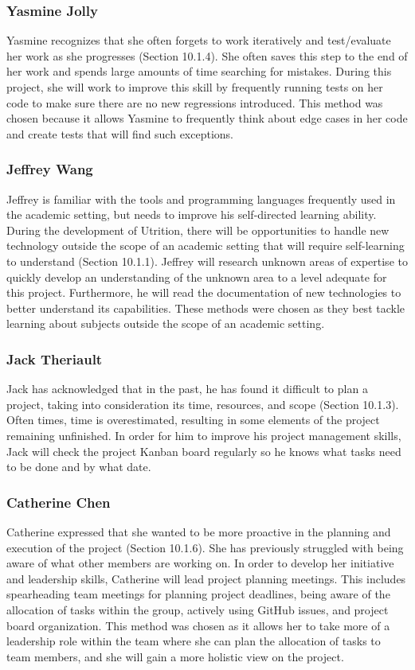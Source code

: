 \documentclass[12pt]{article}
\begin{document}
\subsubsection{Yasmine Jolly}
Yasmine recognizes that she often forgets to work iteratively and test/evaluate her work as she progresses (Section 10.1.4). She often saves this step to the end of her work and spends large amounts of time searching for mistakes. During this project, she will work to improve this skill by frequently running tests on her code to make sure there are no new regressions introduced. This method was chosen because it allows Yasmine to frequently think about edge cases in her code and create tests that will find such exceptions.

\subsubsection{Jeffrey Wang}
Jeffrey is familiar with the tools and programming languages frequently 
used in the academic setting, but needs to improve his self-directed learning 
ability. During the development of Utrition, there will be opportunities to 
handle new technology outside the scope of an academic setting that will 
require self-learning to understand (Section 10.1.1). Jeffrey will research 
unknown areas of expertise to quickly develop an understanding of the unknown 
area to a level adequate for this project. Furthermore, he will read the 
documentation of new technologies to better understand its capabilities. These 
methods were chosen as they best tackle learning about subjects outside the 
scope of an academic setting.

\subsubsection{Jack Theriault}
Jack has acknowledged that in the past, he has found it difficult to plan a project, taking into consideration its time, resources, and scope (Section 10.1.3). Often times, time is overestimated, resulting in some elements of the project remaining unfinished. In order for him to improve his project management skills, Jack will check the project Kanban board regularly so he knows what tasks need to be done and by what date.


\subsubsection{Catherine Chen}
Catherine expressed that she wanted to be more proactive in the planning and execution of the project (Section 10.1.6). She has previously struggled with being aware of what other members are working on. In order to develop her initiative and leadership skills, Catherine will lead project planning meetings. This includes spearheading team meetings for planning project deadlines, being aware of the allocation of tasks within the group, actively using GitHub issues, and project board organization. This method was chosen as it allows her to take more of a leadership role within the team where she can plan the allocation of tasks to team members, and she will gain a more holistic view on the project.
\end{document}
